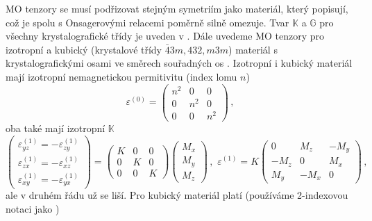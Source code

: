 MO tenzory se musí podřizovat stejným symetriím jako materiál, který popisují, což je spolu s Onsagerovými relacemi poměrně silně omezuje.
Tvar $\mathbb{K}$ a $\mathbb{G}$ pro všechny krystalografické třídy je uveden v \cite{visnovskyOpticsMagneticMultilayers2018}.
Dále uvedeme MO tenzory pro izotropní a kubický (krystalové třídy $\bar{4}3m, 432, m3m$) materiál s krystalografickými osami ve směrech souřadných os \cite{hamrlovaQuadraticinmagnetizationPermittivityConductivity2013,visnovskyOpticsMagneticMultilayers2018}.
Izotropní i kubický materiál mají izotropní nemagnetickou permitivitu (index lomu $n$)
\begin{equation}
    \varepsilon^{(0)}=\begin{pmatrix}
        n^2 & 0 & 0 \\ 0 & n^2 & 0 \\ 0 & 0 & n^2
    \end{pmatrix} \,,
\end{equation}
oba také mají izotropní $\mathbb{K}$
\begin{equation}
    \begin{pmatrix} \varepsilon^{(1)}_{yz}=-\varepsilon^{(1)}_{zy} \\ \varepsilon^{(1)}_{zx}=-\varepsilon^{(1)}_{xz} 
        \\ \varepsilon^{(1)}_{xy}=-\varepsilon^{(1)}_{yx}\end{pmatrix}
    =\begin{pmatrix} K & 0 & 0 \\ 0 & K & 0 \\ 0 & 0 & K \end{pmatrix}
    \begin{pmatrix}M_x \\ M_y \\ M_z\end{pmatrix} 
    \,, \,\, \varepsilon^{(1)}= K 
    \begin{pmatrix} 0 & M_z & -M_y \\ -M_z & 0 & M_x \\ M_y & -M_x & 0 \end{pmatrix} \,,
\end{equation}
ale v druhém řádu už se liší.
Pro kubický materiál platí (používáme 2-indexovou notaci jako \cite{hamrlovaQuadraticinmagnetizationPermittivityConductivity2013})
